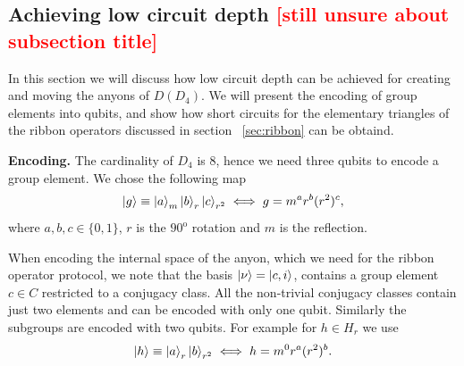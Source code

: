 \documentclass[two column]{article}
\newcommand{\caro}[1]{\textcolor{red}{[#1]}}
\begin{document}

\subsection{Achieving low circuit depth \caro{still unsure about subsection title}}\label{subsec:enc}

In this section we will discuss how low circuit depth can be achieved for creating and moving the anyons of $D(D_4)$. We will present the encoding of group elements into qubits, and show how short circuits for the elementary triangles of the ribbon operators discussed in section ~\ref{sec:ribbon} can be obtaind.

\textbf{Encoding.} 
The cardinality of $D_4$ is 8, hence we need three qubits to encode a group element.
We chose the following map
\begin{equation}
    \ket{g} \equiv \ket{a}_m\ket{b}_r\ket{c}_{r^2} \iff g = m^a r^b (r^2)^c,
\end{equation}
where $a,b,c \in \{0,1\}$, $r$ is the $90^{\text{o}}$ rotation and $m$ is the reflection.

When encoding the internal space of the anyon, which we need for the ribbon operator protocol, we note that the basis $\ket{\nu} = \ket{c, i}$, contains a group element $c\in C$ restricted to a conjugacy class. All the non-trivial conjugacy classes contain just two elements and can be encoded with only one qubit. Similarly the subgroups are encoded with two qubits. For example for $h\in H_r$ we use\begin{equation}
    \ket{h} \equiv \ket{a}_r\ket{b}_{r^2} \iff h = m^0r^a(r^2)^b.
\end{equation}
%
\end{document}
